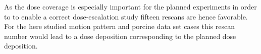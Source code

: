 \documentclass[type=dr, dr=rernat, accentcolor=tud7b,colorbacktitle, bigchapter, openright, twoside, 12pt ]{tudthesis}
\begin{document}
\newline
As the dose coverage is especially important for the planned experiments in order to to enable a correct dose-escalation study fifteen rescans 
are hence favorable. For the here studied motion pattern and porcine data set cases this rescan number would lead to a dose deposition 
corresponding to the planned dose deposition. 


\newpage

\vspace*{0.8cm}
\end{document}
